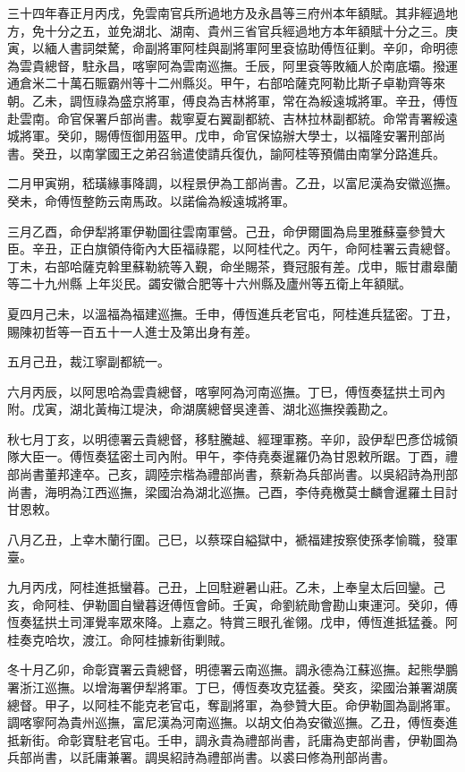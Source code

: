 \begin{pinyinscope}
三十四年春正月丙戌，免雲南官兵所過地方及永昌等三府州本年額賦。其非經過地方，免十分之五，並免湖北、湖南、貴州三省官兵經過地方本年額賦十分之三。庚寅，以緬人書詞桀驁，命副將軍阿桂與副將軍阿里袞協助傅恆征剿。辛卯，命明德為雲貴總督，駐永昌，喀寧阿為雲南巡撫。壬辰，阿里袞等敗緬人於南底壩。撥運通倉米二十萬石賑霸州等十二州縣災。甲午，右部哈薩克阿勒比斯子卓勒齊等來朝。乙未，調恆祿為盛京將軍，傅良為吉林將軍，常在為綏遠城將軍。辛丑，傅恆赴雲南。命官保署戶部尚書。裁寧夏右翼副都統、吉林拉林副都統。命常青署綏遠城將軍。癸卯，賜傅恆御用盔甲。戊申，命官保協辦大學士，以福隆安署刑部尚書。癸丑，以南掌國王之弟召翁遣使請兵復仇，諭阿桂等預備由南掌分路進兵。

二月甲寅朔，嵇璜緣事降調，以程景伊為工部尚書。乙丑，以富尼漢為安徽巡撫。癸未，命傅恆整飭云南馬政。以諾倫為綏遠城將軍。

三月乙酉，命伊犁將軍伊勒圖往雲南軍營。己丑，命伊爾圖為烏里雅蘇臺參贊大臣。辛丑，正白旗領侍衛內大臣福祿罷，以阿桂代之。丙午，命阿桂署云貴總督。丁未，右部哈薩克斡里蘇勒統等入覲，命坐賜茶，賚冠服有差。戊申，賑甘肅皋蘭等二十九州縣上年災民。蠲安徽合肥等十六州縣及廬州等五衛上年額賦。

夏四月己未，以溫福為福建巡撫。壬申，傅恆進兵老官屯，阿桂進兵猛密。丁丑，賜陳初哲等一百五十一人進士及第出身有差。

五月己丑，裁江寧副都統一。

六月丙辰，以阿思哈為雲貴總督，喀寧阿為河南巡撫。丁巳，傅恆奏猛拱土司內附。戊寅，湖北黃梅江堤決，命湖廣總督吳達善、湖北巡撫揆義勘之。

秋七月丁亥，以明德署云貴總督，移駐騰越、經理軍務。辛卯，設伊犁巴彥岱城領隊大臣一。傅恆奏猛密土司內附。甲午，李侍堯奏暹羅仍為甘恩敕所踞。丁酉，禮部尚書董邦達卒。己亥，調陸宗楷為禮部尚書，蔡新為兵部尚書。以吳紹詩為刑部尚書，海明為江西巡撫，梁國治為湖北巡撫。己酉，李侍堯檄莫士麟會暹羅土目討甘恩敕。

八月乙丑，上幸木蘭行圍。己巳，以蔡琛自縊獄中，褫福建按察使孫孝愉職，發軍臺。

九月丙戌，阿桂進抵蠻暮。己丑，上回駐避暑山莊。乙未，上奉皇太后回鑾。己亥，命阿桂、伊勒圖自蠻暮迓傅恆會師。壬寅，命劉統勛會勘山東運河。癸卯，傅恆奏猛拱土司渾覺率眾來降。上嘉之。特賞三眼孔雀翎。戊申，傅恆進抵猛養。阿桂奏克哈坎，渡江。命阿桂據新街剿賊。

冬十月乙卯，命彰寶署云貴總督，明德署云南巡撫。調永德為江蘇巡撫。起熊學鵬署浙江巡撫。以增海署伊犁將軍。丁巳，傅恆奏攻克猛養。癸亥，梁國治兼署湖廣總督。甲子，以阿桂不能克老官屯，奪副將軍，為參贊大臣。命伊勒圖為副將軍。調喀寧阿為貴州巡撫，富尼漢為河南巡撫。以胡文伯為安徽巡撫。乙丑，傅恆奏進抵新街。命彰寶駐老官屯。壬申，調永貴為禮部尚書，託庸為吏部尚書，伊勒圖為兵部尚書，以託庸兼署。調吳紹詩為禮部尚書。以裘曰修為刑部尚書。


\end{pinyinscope}
